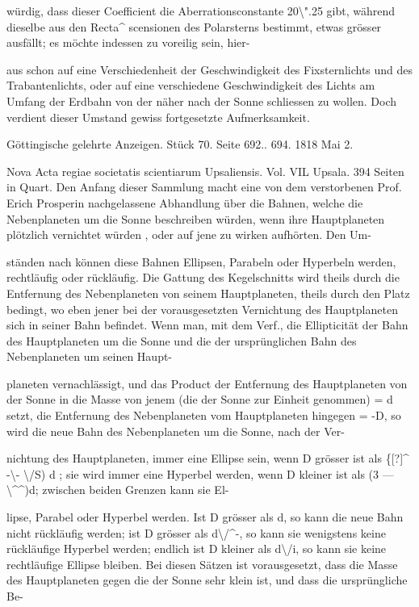 \documentclass[10pt,a4paper]{article}
\begin{document}
würdig, dass dieser Coefficient die Aberrationsconstante 20\textbackslash{}".25 gibt, während dieselbe aus den Recta\textasciicircum{} scensionen des Polarsterns bestimmt, etwas grösser ausfällt; es möchte indessen zu voreilig sein, hier-

aus schon auf eine Verschiedenheit der Geschwindigkeit des Fixsternlichts und des Trabantenlichts, oder auf eine verschiedene Geschwindigkeit des Lichts am Umfang der Erdbahn von der näher nach der Sonne schliessen zu wollen. Doch verdient dieser Umstand gewiss fortgesetzte Aufmerksamkeit.

Göttingische gelehrte Anzeigen. Stück 70. Seite 692.. 694. 1818 Mai 2.

Nova Acta regiae societatis scientiarum Upsaliensis. Vol. VIL Upsala. 394 Seiten in Quart. Den Anfang dieser Sammlung macht eine von dem verstorbenen Prof. Erich Prosperin nachgelassene Abhandlung über die Bahnen, welche die Nebenplaneten um die Sonne beschreiben würden, wenn ihre Hauptplaneten plötzlich vernichtet würden , oder auf jene zu wirken aufhörten. Den Um-

ständen nach können diese Bahnen Ellipsen, Parabeln oder Hyperbeln werden, rechtläufig oder rückläufig. Die Gattung des Kegelschnitts wird theils durch die Entfernung des Nebenplaneten von seinem Hauptplaneten, theils durch den Platz bedingt, wo eben jener bei der vorausgesetzten Vernichtung des Hauptplaneten sich in seiner Bahn befindet. Wenn man, mit dem Verf., die Ellipticität der Bahn des Hauptplaneten um die Sonne und die der ursprünglichen Bahn des Nebenplaneten um seinen Haupt-

planeten vernachlässigt, und das Product der Entfernung des Hauptplaneten von der Sonne in die Masse von jenem (die der Sonne zur Einheit genommen) = d setzt, die Entfernung des Nebenplaneten vom Hauptplaneten hingegen = -D, so wird die neue Bahn des Nebenplaneten um die Sonne, nach der Ver-

nichtung des Hauptplaneten, immer eine Ellipse sein, wenn D grösser ist als \{[?]\textasciicircum{} -\textbackslash{}- \textbackslash{}/S) d ; sie wird immer eine Hyperbel werden, wenn D kleiner ist als (3 — \textbackslash{}\textasciicircum{}\textasciicircum{})d; zwischen beiden Grenzen kann sie El-

lipse, Parabel oder Hyperbel werden. Ist D grösser als d, so kann die neue Bahn nicht rückläufig werden; ist D grösser als d\textbackslash{}/\textasciicircum{}-, so kann sie wenigstens keine rückläufige Hyperbel werden; endlich ist D kleiner als d\textbackslash{}/i, so kann sie keine rechtläufige Ellipse bleiben. Bei diesen Sätzen ist vorausgesetzt, dass die Masse des Hauptplaneten gegen die der Sonne sehr klein ist, und dass die ursprüngliche Be-
\end{document}
